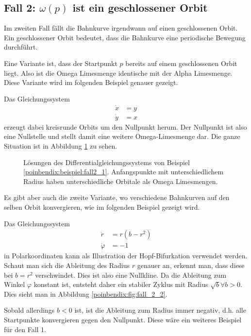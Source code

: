 \subsection{Fall 2: $\omega(p)$ ist ein geschlossener Orbit} \label{poinbendix:subsection:fall2}

Im zweiten Fall fällt die Bahnkurve irgendwann auf einen geschlossenen Orbit.
Ein geschlossener Orbit bedeutet, dass die Bahnkurve eine periodische Bewegung durchführt.

Eine Variante ist, dass der Startpunkt $p$ bereits auf einem geschlossenen Orbit liegt.
Also ist die Omega Limesmenge identische mit der Alpha Limesmenge.
Diese Variante wird im folgenden Beispiel genauer gezeigt.


\begin{beispiel} \label{poinbendix:beispiel:fall2_1}
Das Gleichungssystem
\begin{align*}
    \dot{x} &= y \\
    \dot{y} &= x
\end{align*}
erzeugt dabei kreisrunde Orbits um den Nullpunkt herum.
Der Nullpunkt ist also eine Nullstelle und stellt damit eine weitere Omega-Limesmenge dar.
Die ganze Situation ist in Abbildung \ref{poinbendix:fig:fall_2} zu sehen.

\begin{figure}
\centering
    
    \caption{Lösungen des Differentialgleichungssystems von Beispiel \ref{poinbendix:beispiel:fall2_1}.
    Anfangspunkte mit unterschiedlichem Radius haben unterschiedliche Orbitale als Omega Limesmengen.}
\label{poinbendix:fig:fall_2}
\end{figure}

\end{beispiel}

Es gibt aber auch die zweite Variante, wo verschiedene Bahnkurven auf den selben Orbit konvergieren, wie im folgenden Beispiel gezeigt wird.

\begin{beispiel} \label{poinbendix:beispiel:fall2_2}
Das Gleichungssystem
\begin{align*}
    \dot{r}       &= r(b-r^2) \\
    \dot{\varphi} &= -1
\end{align*}
in Polarkoordinaten kann als Illustration der Hopf-Bifurkation verwendet werden.
Schaut man sich die Ableitung des Radius $r$ genauer an, erkennt man, dass diese bei $b = r^2$ verschwindet.
Dies ist also eine Nullkline.
Da die Ableitung zum Winkel $\varphi$ konstant ist, entsteht daher ein stabiler Zyklus mit Radius $\sqrt{b} \forall b > 0$.
Dies sieht man in Abbildung \ref{poinbendix:fig:fall_2_2}.

Sobald allerdings $b < 0$ ist, ist die Ableitung zum Radius immer negativ, d.h. alle Startpunkte konvergieren gegen den Nullpunkt.
Diese wäre ein weiteres Beispiel für den Fall 1.
\end{beispiel}

